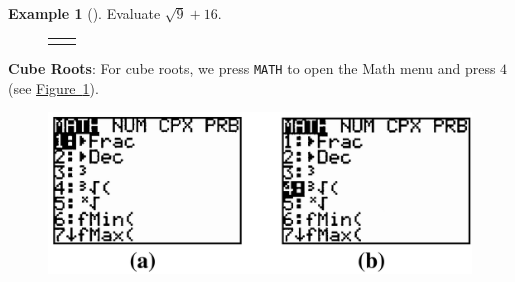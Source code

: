 \documentclass[10pt,]{book}
\newcommand{\terminology}[1]{\textbf{#1}}
\theoremstyle{plain}
\theoremstyle{definition}
\theoremstyle{definition}
\newtheorem{example}[theorem]{Example}
\theoremstyle{definition}
\numberwithin{equation}{part}
\newlength{\panelmax}
\begin{document}
\begin{example}[]\label{example-105}
Evaluate \(\sqrt{9}+16 \).%
{%
\setlength{\panelmax}{0pt}
\newsavebox{\panelboxAJAp}
\newlength{\phAJAp}\setlength{\phAJAp}{\ht\panelboxAJAp+\dp\panelboxAJAp}
\settototalheight{\phAJAp}{\usebox{\panelboxAJAp}}
\setlength{\panelmax}{\maxof{\panelmax}{\phAJAp}}
\newsavebox{\panelboxAJBp}
\newlength{\phAJBp}\setlength{\phAJBp}{\ht\panelboxAJBp+\dp\panelboxAJBp}
\settototalheight{\phAJBp}{\usebox{\panelboxAJBp}}
\setlength{\panelmax}{\maxof{\panelmax}{\phAJBp}}
\leavevmode%
\setlength{\tabcolsep}{0.025\textwidth}
\begin{figure}
\begin{tabular}{@{}*{2}{c}@{}}
\begin{minipage}[c][\panelmax][t]{0.6\textwidth}\usebox{\panelboxAJAp}\end{minipage}&
\begin{minipage}[c][\panelmax][t]{0.35\textwidth}\usebox{\panelboxAJBp}\end{minipage}\end{tabular}
\end{figure}
}%
\end{example}
\par
\terminology{Cube Roots}: For cube roots, we press \lstinline?MATH? to open the Math menu and press \(4\) (see \hyperref[fig-GC-settings2]{Figure~\ref{fig-GC-settings2}}). \leavevmode%
\begin{figure}
\centering
\includegraphics[width=0.7\linewidth]{images/fig-GC-settings2.jpg}
\caption{\label{fig-GC-settings2}}
\end{figure}
\end{document}
